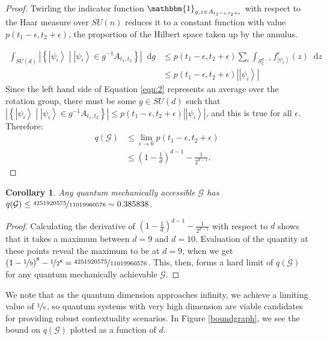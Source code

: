 \documentclass{amsart}
\newtheorem{cor}{Corollary}
\theoremstyle{definition}
\newcommand{\ket}[1]{{\left\vert{#1}\right\rangle}}
\newcommand*\dif{\mathop{}\!\mathrm{d}}
\begin{document}
\begin{proof}
Twirling the indicator function $ \mathbbm{1}_{g.z\in A_{t_1-\epsilon,t_2+\epsilon}}$ with respect to the Haar measure over $SU(n)$ reduces it to a constant function with value $p(t_1-\epsilon,t_2+\epsilon)$, the proportion of the Hilbert space taken up by the annulus.

\begin{align}
\int_{SU(d)} \left|\left\{\ket{\psi_i} \middle| \ket{\psi_i} \in g^{-1}A_{t_1,t_2}\right\}\right| \dif g &\leq p(t_1-\epsilon,t_2+\epsilon)\sum_i\int_{S_\mathbb{C}^{d-1}}f^\epsilon_\ket{\psi_i}(z)  \dif z \label{eqn:2}\\
&\leq p(t_1-\epsilon,t_2+\epsilon)\left|\ket{\psi_i}\right|
\end{align}
Since the left hand side of Equation \ref{eqn:2} represents an average over the rotation group, there must be some $g\in SU(d)$ such that $\left|\left\{\ket{\psi_i} \middle| \ket{\psi_i} \in g^{-1}A_{t_1,t_2}\right\}\right|\leq p(t_1-\epsilon,t_2+\epsilon)\left|\ket{\psi_i}\right|$, and this is true for all $\epsilon$. Therefore:
\begin{align}
q(\mathcal{G})&\leq \lim_{\epsilon\rightarrow0}p(t_1-\epsilon,t_2+\epsilon) \\
&\leq \left(1-\frac1d\right)^{d-1}-\frac{1}{2^{d-1}}.
\end{align}

\end{proof} 
\begin{cor}
Any quantum mechanically accessible $\mathcal{G}$ has  $q(\mathcal{G})\leq\nicefrac{4251920575}{11019960576}\sim0.385838$.
\end{cor}
\begin{proof}
Calculating the derivative of $ \left(1-\frac1d\right)^{d-1}-\frac{1}{2^{d-1}}$ with respect to $d$ shows that it takes a maximum between $d=9$ and $d=10$. Evaluation of the quantity at these points reveal the maximum to be at $d=9$, when we get $\left(1-\nicefrac19\right)^{8}-\nicefrac{1}{2^{8}}=\nicefrac{4251920575}{11019960576}$. This, then, forms a hard limit of $q(\mathcal{G})$ for any quantum mechanically achievable $\mathcal{G}$.
\end{proof}
We note that as the quantum dimension approaches infinity, we achieve a limiting value of $\nicefrac1e$, so quantum systems with very high dimension are viable candidates for providing robust contextuality scenarios. In Figure \ref{boundgraph}, we see the bound on $q(\mathcal{G})$ plotted as a function of $d$.
\end{document}
